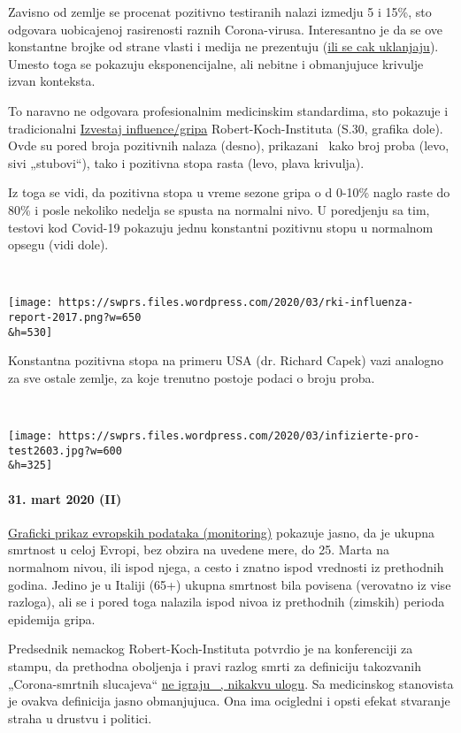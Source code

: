 Zavisno od zemlje se procenat pozitivno testiranih nalazi izmedju 5 i
15\%, sto odgovara uobicajenoj rasirenosti raznih Corona-virusa.
Interesantno je da se ove konstantne brojke od strane vlasti i medija ne
prezentuju
(\href{https://multipolar-magazin.de/artikel/coronavirus-irrefuhrung-fallzahlen}{ili
se cak uklanjaju}). Umesto toga se pokazuju eksponencijalne, ali nebitne
i obmanjujuce krivulje izvan konteksta.

To naravno ne odgovara profesionalnim medicinskim standardima, sto
pokazuje i tradicionalni
\href{https://influenza.rki.de/Saisonberichte/2017.pdf}{Izvestaj
influence/gripa} Robert-Koch-Instituta (S.30, grafika dole). Ovde su
pored broja pozitivnih nalaza (desno), prikazani ~kako broj proba (levo,
sivi „stubovi``), tako i pozitivna stopa rasta (levo, plava krivulja).

Iz toga se vidi, da pozitivna stopa u vreme sezone gripa o d 0-10\%
naglo raste do 80\% i posle nekoliko nedelja se spusta na normalni nivo.
U poredjenju sa tim, testovi kod Covid-19 pokazuju jednu konstantni
pozitivnu stopu u normalnom opsegu (vidi dole).

~

\texttt{[image: https://swprs.files.wordpress.com/2020/03/rki-influenza-report-2017.png?w=650\\\&h=530]}

Konstantna pozitivna stopa na primeru USA (dr. Richard Capek) vazi
analogno za sve ostale zemlje, za koje trenutno postoje podaci o broju
proba.

~

\texttt{[image: https://swprs.files.wordpress.com/2020/03/infizierte-pro-test2603.jpg?w=600\\\&h=325]}

\hypertarget{31-mart-2020-ii}{%
\paragraph{31. mart 2020 (II)}\label{31-mart-2020-ii}}

\href{https://off-guardian.org/2020/03/30/covid19-yet-to-impact-europes-overall-mortality/}{Graficki
prikaz evropskih podataka (monitoring)} pokazuje jasno, da je ukupna
smrtnost u celoj Evropi, bez obzira na uvedene mere, do 25. Marta na
normalnom nivou, ili ispod njega, a cesto i znatno ispod vrednosti iz
prethodnih godina. Jedino je u Italiji (65+) ukupna smrtnost bila
povisena (verovatno iz vise razloga), ali se i pored toga nalazila ispod
nivoa iz prethodnih (zimskih) perioda epidemija gripa.

Predsednik nemackog Robert-Koch-Instituta potvrdio je na konferenciji za
stampu, da prethodna oboljenja i pravi razlog smrti za definiciju
takozvanih „Corona-smrtnih slucajeva``
\href{https://swprs.org/rki-relativiert-corona-todesfaelle/}{ne igraju
~, nikakvu ulogu}. Sa medicinskog stanovista je ovakva definicija jasno
obmanjujuca. Ona ima ocigledni i opsti efekat stvaranje straha u drustvu
i politici.


